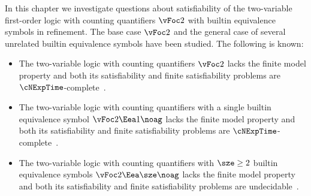 In this chapter we investigate questions about satisfiability of the
two-variable first-order logic with counting quantifiers $\vFoc2$
with builtin equivalence symbols in refinement.
The base case $\vFoc2$ and the general case of several unrelated builtin
equivalence symbols have been studied. The following is known:
\begin{itemize}
  \item
  The two-variable logic with counting quantifiers $\vFoc2$ lacks the
  finite model property and both its satisfiability and finite satisfiability
  problems are $\cNExpTime$-complete~\cite{Pratt-Hartmann2005}.
  \item
  The two-variable logic with counting quantifiers with a single builtin
  equivalence symbol $\vFoc2\Eea1\noag$ lacks the finite model property and both
  its satisfiability and finite satisfiability problems are
  $\cNExpTime$-complete~\cite{MALQ:MALQ201400102}.
  \item
  The two-variable logic with counting quantifiers with $\sze\geq2$ builtin
  equivalence symbols $\vFoc2\Eea\sze\noag$ lacks the finite model property and
  both its satisfiability and finite satisfiability problems are
  undecidable~\cite{MALQ:MALQ201400102}.
\end{itemize}
